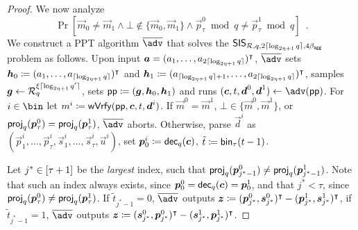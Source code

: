 \begin{proof}
  We now analyze 
  \[
    \Pr[\vec{m}_0\neq \vec{m}_1 \land \bot\not\in\{\vec{m}_0,\vec{m}_1\} \land \vec{p}_\tau^0 \bmod q \neq \vec{p}_\tau^1 \bmod q]\enspace.
  \]
  We construct a PPT algorithm $\sisadv$ that solves the $\mathsf{SIS}_{\mathcal{R},q,2 \lceil \log_{2\eta+1} q \rceil,4\beta_{\mathsf{agg}}}$ problem as follows.
  Upon input $\boldsymbol{a}=(a_1,\dots,a_{2 \lceil \log_{2\eta+1} q \rceil})^\intercal$,
  $\sisadv$ sets 
  $\boldsymbol{h}_0\coloneqq(a_1,\dots,a_{\lceil \log_{2\eta+1} q \rceil})^\intercal$ and 
  $\boldsymbol{h}_1 \coloneqq (a_{\lceil \log_{2\eta+1} q \rceil+1},\dots,\allowbreak a_{2\lceil \log_{2\eta+1} q \rceil})^\intercal$,
  samples $\boldsymbol{g} \gets \mathcal{R}_q^{\xi\lceil \log_{2\eta+1} q' \rceil}$, sets $\mathsf{pp} \coloneqq (\boldsymbol{g}, \boldsymbol{h}_0, \boldsymbol{h}_1)$ and runs 
  $(\vec{c}, t,\vec{d}^0,\vec{d}^1) \gets \adv(\params)$.
  For $i\in\bin$ let $m^i \coloneqq \mathsf{wVrfy}(\mathsf{pp},\boldsymbol{c},t,\boldsymbol{d}^i)$.
  If $\vec{m}^0 = \vec{m}^1$, $\bot\in\{\vec{m}^0,\vec{m}^1\}$, or $\mathsf{proj}_{q}(\boldsymbol{p}_\tau^0) = \mathsf{proj}_{q}(\boldsymbol{p}_\tau^1)$, $\sisadv$ aborts.
  Otherwise, parse $\vec{d}^i$ as $(\vec{p}^i_1,\dots,\vec{p}^i_{\tau},\vec{s}^i_1,\dots,\vec{s}^i_\tau,\vec{u}^i)$, set $\boldsymbol{p}^i_0 \coloneqq \mathsf{dec}_{q}(\boldsymbol{c})$, $\tilde{t}\coloneqq \mathsf{bin}_{\tau}(t-1)$.
  
  Let $j^*\in [\tau+1]$ be the \emph{largest} index, such that $\mathsf{proj}_{q}(\boldsymbol{p}^0_{j^*-1})\neq\mathsf{proj}_{q}(\boldsymbol{p}^1_{j^*-1})$.
  Note that such an index always exists, since $\boldsymbol{p}^0_0 = \mathsf{dec}_{q}(\boldsymbol{c}) = \boldsymbol{p}^1_0$, and that $j^* < \tau$, since $\mathsf{proj}_{q}(\boldsymbol{p}_\tau^0) \neq \mathsf{proj}_{q}(\boldsymbol{p}_\tau^1)$.
  If $\tilde t_{j^*-1} = 0$, $\sisadv$ outputs $
  \boldsymbol{z}\coloneqq(\boldsymbol{p}_{j^*}^0, \boldsymbol{s}_{j^*}^0)^\intercal - (\boldsymbol{p}_{j^*}^1, \boldsymbol{s}_{j^*}^1)^\intercal$, if $\tilde t_{j^*-1} = 1$, $\sisadv$ outputs $\boldsymbol{z}\coloneqq(\boldsymbol{s}_{j^*}^0, \boldsymbol{p}_{j^*}^0)^\intercal - (\boldsymbol{s}_{j^*}^1, \boldsymbol{p}_{j^*}^1)^\intercal$.
  

\end{proof}
